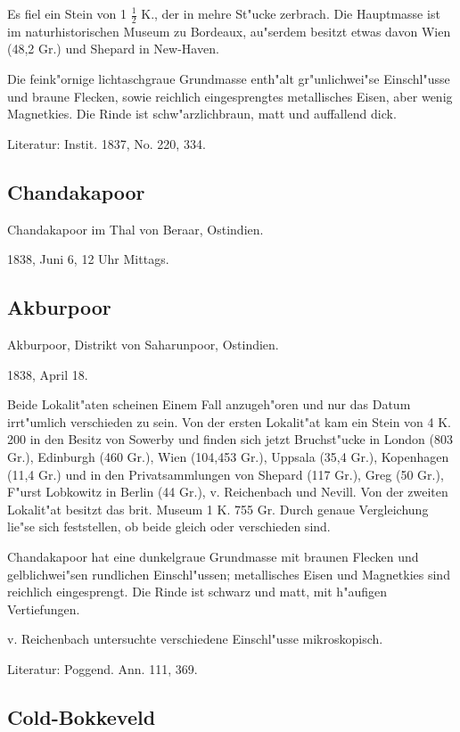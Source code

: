 \documentclass[a4paper, 11pt, oneside]{article}
\begin{document}
Es fiel ein Stein von 1 $\frac{1}{2}$ K., der in mehre St"ucke zerbrach. Die Hauptmasse ist im naturhistorischen Museum zu Bordeaux, au"serdem besitzt etwas davon Wien (48,2 Gr.) und Shepard in New-Haven.

Die feink"ornige lichtaschgraue Grundmasse enth"alt gr"unlichwei"se Einschl"usse und braune Flecken, sowie reichlich eingesprengtes metallisches Eisen, aber wenig Magnetkies. Die Rinde ist schw"arzlichbraun, matt und auffallend dick.

Literatur: Instit. 1837, No. 220, 334.

\subsection{Chandakapoor}

Chandakapoor im Thal von Beraar, Ostindien.

1838, Juni 6, 12 Uhr Mittags.

\subsection{Akburpoor}

Akburpoor, Distrikt von Saharunpoor, Ostindien.

1838, April 18.

Beide Lokalit"aten scheinen Einem Fall anzugeh"oren und nur das Datum irrt"umlich verschieden zu sein. Von der ersten Lokalit"at kam ein Stein von 4 K. 200 in den Besitz von Sowerby und finden sich jetzt Bruchst"ucke in London (803 Gr.), Edinburgh (460 Gr.), Wien (104,453 Gr.), Uppsala (35,4 Gr.), Kopenhagen (11,4 Gr.) und in den Privatsammlungen von Shepard (117 Gr.), Greg (50 Gr.), F"urst Lobkowitz in Berlin (44 Gr.), v. Reichenbach und Nevill. Von der zweiten Lokalit"at besitzt das brit. Museum 1 K. 755 Gr. Durch genaue Vergleichung lie"se sich feststellen, ob beide gleich oder verschieden sind.

Chandakapoor hat eine dunkelgraue Grundmasse mit braunen Flecken und gelblichwei"sen rundlichen Einschl"ussen; metallisches Eisen und Magnetkies sind reichlich eingesprengt. Die Rinde ist schwarz und matt, mit h"aufigen Vertiefungen.

v. Reichenbach untersuchte verschiedene Einschl"usse mikroskopisch.

Literatur: Poggend. Ann. 111, 369.

\subsection{Cold-Bokkeveld}
\end{document}
